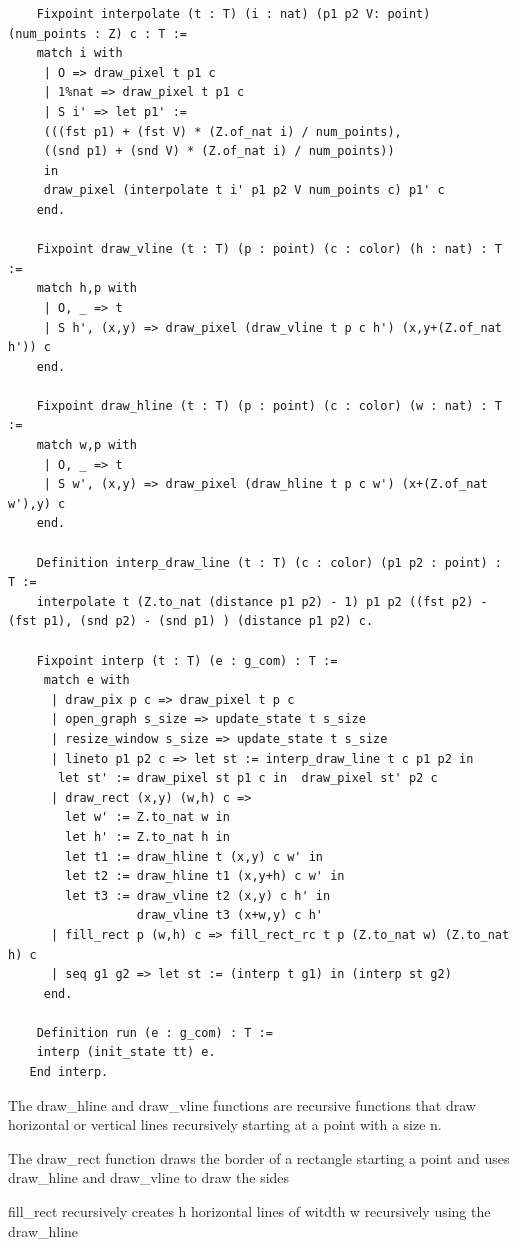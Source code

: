 \documentclass{llncs}
\begin{document}
 \begin{lstlisting}
    Fixpoint interpolate (t : T) (i : nat) (p1 p2 V: point) (num_points : Z) c : T :=
    match i with
     | O => draw_pixel t p1 c
     | 1%nat => draw_pixel t p1 c
     | S i' => let p1' :=
     (((fst p1) + (fst V) * (Z.of_nat i) / num_points),
     ((snd p1) + (snd V) * (Z.of_nat i) / num_points))
     in
     draw_pixel (interpolate t i' p1 p2 V num_points c) p1' c 
    end.

    Fixpoint draw_vline (t : T) (p : point) (c : color) (h : nat) : T :=
    match h,p with
     | O, _ => t
     | S h', (x,y) => draw_pixel (draw_vline t p c h') (x,y+(Z.of_nat h')) c
    end.

    Fixpoint draw_hline (t : T) (p : point) (c : color) (w : nat) : T :=
    match w,p with
     | O, _ => t
     | S w', (x,y) => draw_pixel (draw_hline t p c w') (x+(Z.of_nat w'),y) c
    end.

    Definition interp_draw_line (t : T) (c : color) (p1 p2 : point) : T :=
    interpolate t (Z.to_nat (distance p1 p2) - 1) p1 p2 ((fst p2) - (fst p1), (snd p2) - (snd p1) ) (distance p1 p2) c.

    Fixpoint interp (t : T) (e : g_com) : T :=
     match e with
      | draw_pix p c => draw_pixel t p c
      | open_graph s_size => update_state t s_size
      | resize_window s_size => update_state t s_size 
      | lineto p1 p2 c => let st := interp_draw_line t c p1 p2 in 
       let st' := draw_pixel st p1 c in  draw_pixel st' p2 c
      | draw_rect (x,y) (w,h) c =>
        let w' := Z.to_nat w in
        let h' := Z.to_nat h in
        let t1 := draw_hline t (x,y) c w' in
        let t2 := draw_hline t1 (x,y+h) c w' in
        let t3 := draw_vline t2 (x,y) c h' in
                  draw_vline t3 (x+w,y) c h'
      | fill_rect p (w,h) c => fill_rect_rc t p (Z.to_nat w) (Z.to_nat h) c
      | seq g1 g2 => let st := (interp t g1) in (interp st g2)
     end.

    Definition run (e : g_com) : T :=
    interp (init_state tt) e.
   End interp.
 \end{lstlisting}
 
 
 The draw\_hline and draw\_vline functions are recursive functions that draw horizontal or vertical lines recursively starting at a point with a size n.
 
 The draw\_rect function draws the border of a rectangle starting a point and uses draw\_hline and draw\_vline to draw the sides
 
 fill\_rect recursively creates h horizontal lines of witdth w recursively using the draw\_hline
 
\end{document}
